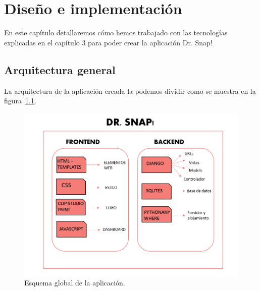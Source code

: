 \documentclass[a4paper, 12pt]{book}
\begin{document}

\cleardoublepage
\chapter{Diseño e implementación}
En este capítulo detallaremos cómo hemos trabajado con las tecnologías explicadas en el capítulo 3 para poder crear la aplicación Dr. Snap!
\section{Arquitectura general} 
La arquitectura de la aplicación creada la podemos dividir como se muestra en la figura~\ref{figura:esquema}.
\begin{figure}[h]
            \centering
            \includegraphics[scale=0.5]{img/arquitectura.PNG}
            \caption{Esquema global de la aplicación.}
            \label{figura:esquema}
        \end{figure}

\label{sec:arquitectura}
\end{document}
